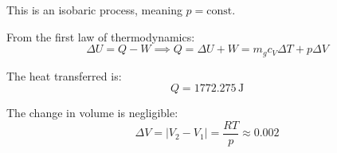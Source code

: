 This is an isobaric process, meaning \( p = \text{const} \).  

From the first law of thermodynamics:  
\[
\Delta U = Q - W \implies Q = \Delta U + W = m_g c_V \Delta T + p \Delta V
\]  

The heat transferred is:  
\[
Q = 1772.275 \, \text{J}
\]  

The change in volume is negligible:  
\[
\Delta V = \left| V_2 - V_1 \right| = \frac{R T}{p} \approx 0.002
\]
